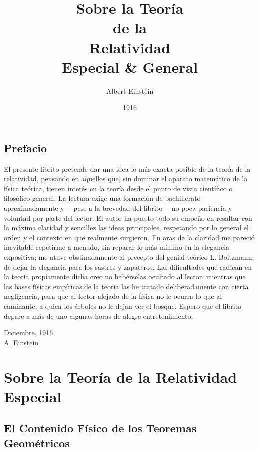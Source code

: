 \documentclass[spanish]{book}
\begin{document}
\title{\textbf{\Huge Sobre la Teoría}\\
       \textbf{\Huge de la}\\
       \textbf{\Huge Relatividad}\\
       \textbf{\Huge Especial \& General}}
\author{{\Large Albert Einstein}}
\date{1916}


\maketitle

\chapter*{Prefacio}

El presente librito pretende dar una idea lo más exacta posible de la teoría de la relatividad, pensando en aquellos que, sin dominar el aparato matemático de la física teórica, tienen interés en la teoría desde el punto de vista científico o filosófico general. La lectura exige una formación de bachillerato aproximadamente y ---pese a la brevedad del librito--- no poca paciencia y voluntad por parte del lector. El autor ha puesto todo su empeño en resaltar con la máxima claridad y sencillez las ideas principales, respetando por lo general el orden y el contexto en que realmente surgieron. En aras de la claridad me pareció inevitable repetirme a menudo, sin reparar lo más mínimo en la elegancia expositiva; me atuve obstinadamente al precepto del genial teórico L. Boltzmann, de dejar la elegancia para los sastres y zapateros. Las dificultades que radican en la teoría propiamente dicha creo no habérselas ocultado al lector, mientras que las bases físicas empíricas de la teoría las he tratado deliberadamente con cierta negligencia, para que al lector alejado de la física no le ocurra lo que al caminante, a quien los árboles no le dejan ver el bosque. Espero que el librito depare a más de uno algunas horas de alegre entretenimiento.

\bigskip

{\raggedleft Diciembre, 1916\\
{\sc A. Einstein}}

\part{Sobre la Teoría de la Relatividad Especial}

\chapter{El Contenido Físico de los Teoremas Geométricos}
\end{document}
